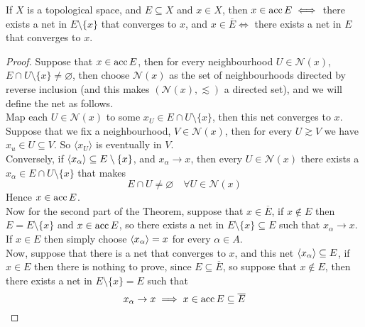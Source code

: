 \documentclass[../../main.tex]{subfiles}
\begin{document}
\begin{wts}
If $X$ is a topological space, and $E\subseteq X$ and $x\in X$, then $x\in\operatorname{acc}{E}\iff$ there exists a net in $E\setminus\{x\}$ that converges to $x$, and $x\in \overline{E}\iff$ there exists a net in $E$ that converges to $x$.
\end{wts}
\newcommand{\nx}{\mathcal{N}(x)} %
\begin{proof}
Suppose that $x\in\operatorname{acc}{E}$, then for every neighbourhood $U\in\mathcal{N}(x)$, $E\cap U\setminus\{x\}\neq\varnothing$, then choose $\mathcal{N}(x)$ as the set of neighbourhoods directed by reverse inclusion (and this makes $(\mathcal{N}(x),\lesssim)$ a directed set), and we will define the net as follows.\\

Map each $U\in \mathcal{N}(x)$ to some $x_U\in E\cap U\setminus\{x\}$, then this net converges to $x$. Suppose that we fix a neighbourhood, $V\in\nx$, then for every $U\gtrsim V$ we have $x_u\in U\subseteq V$. So $\langle x_U \rangle$ is eventually in $V$.\\

Conversely, if $\langle {x_\alpha} \rangle\subseteq E\setminus\{x\}$, and $x_\alpha\to x$, then every $U\in\nx$ there exists a $x_\alpha\in E\cap U\setminus\{x\}$ that makes
\[
E\cap U\neq \varnothing\quad \forall U\in\nx
\]
Hence $x\in\operatorname{acc}{E}$.\\

Now for the second part of the Theorem, suppose that $x\in\overline{E}$, if $x\notin E$ then $E = E\setminus\{x\}$ and $x\in\operatorname{acc}{E}$, so there exists a net in $E\setminus\{x\}\subseteq E$ such that $x_\alpha\to x$. If $x\in E$ then simply choose $\langle {x_\alpha} \rangle=x$ for every $\alpha\in A$.\\

Now, suppose that there is a net that converges to $x$, and this net $\langle {x_\alpha} \rangle\subseteq E$, if $x\in E$ then there is nothing to prove, since $E\subseteq\overline{E}$, so suppose that $x\notin E$, then there exists a net in $E\setminus\{x\}=E$ such that 
\[
x_\alpha\to x\implies x\in\operatorname{acc}{E}\subseteq\overline{E}
\]
\end{proof}
\end{document}
